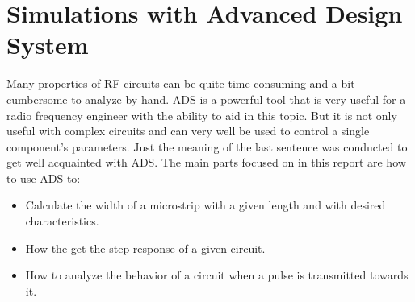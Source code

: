 \documentclass[report.tex]{subfiles}
\begin{document}
\section{Simulations with Advanced Design System}
Many properties of RF circuits can be quite time consuming and a bit cumbersome to analyze by hand. ADS is a powerful tool that is very useful for a radio frequency engineer with the ability to aid in this topic. But it is not only useful with complex circuits and can very well be used to control a single component's parameters.
Just the meaning of the last sentence was conducted to get well acquainted with ADS. The main parts focused on in this report are how to use ADS to:
\begin{itemize}
	\item Calculate the width of a microstrip with a given length and with desired characteristics.
	\item How the get the step response of a given circuit.
	\item How to analyze the behavior of a circuit when a pulse is transmitted towards it.
\end{itemize}







\end{document}
